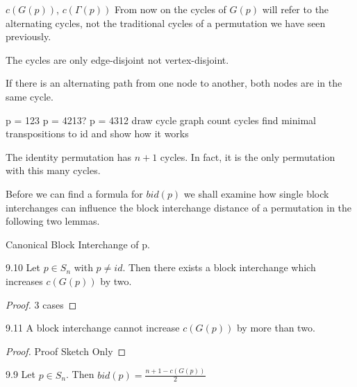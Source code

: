 \begin{definition}
$c(G(p))$, $c(\Gamma (p))$
From now on the cycles of $G(p)$ will refer to the alternating cycles, not the traditional cycles of a permutation we have seen previously. 
\end{definition}

\begin{remark}
The cycles are only edge-disjoint not vertex-disjoint.
\end{remark}

\begin{remark}
If there is an alternating path from one node to another, both nodes are in the same cycle.
\end{remark}

\begin{example}
p = 123
p = 4213?
p = 4312
draw cycle graph
count cycles
find minimal transpositions to id and show how it works
\end{example}

\begin{remark}
The identity permutation has $n+1$ cycles. In fact, it is the only permutation with this many cycles.
\end{remark}

Before we can find a formula for $bid(p)$ we shall examine how single block interchanges can influence the block interchange distance of a permutation in the following two lemmas.

\begin{definition}
Canonical Block Interchange of p.
\end{definition}

\begin{lemma}
9.10
Let $p \in S_n$ with $p \neq id$. Then there exists a block interchange which increases $c(G(p))$ by two.
\end{lemma}

\begin{proof}
3 cases
\end{proof}

\begin{lemma}
9.11
A block interchange cannot increase $c(G(p))$ by more than two.
\end{lemma}

\begin{proof}
Proof Sketch Only
\end{proof}

\begin{theorem}
9.9
Let $p \in S_n$. Then $bid(p) = \frac{n+1-c(G(p))}{2}$
\end{theorem}

